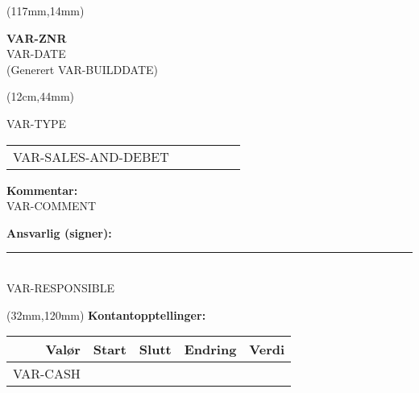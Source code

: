 \documentclass[a4paper, 12pt]{article}
\begin{document}
\begin{textblock*}{47mm}(117mm,14mm)
    \begin{center}
        \Large
        \textbf{VAR-ZNR}
        \normalsize
        \\[1mm]
        VAR-DATE
        \\[1mm]
        \scriptsize{(Generert VAR-BUILDDATE)}
    \end{center}
\end{textblock*}


\begin{textblock*}{8cm}(12cm,44mm)

    VAR-TYPE



    \vspace{5mm}


    \hskip-1.6cm\begin{tabularx}{\textwidth + 1.6cm}{rrcrrX}
        VAR-SALES-AND-DEBET
    \end{tabularx}
    \vspace{5mm}


    \textbf{Kommentar:} \\
VAR-COMMENT


    \vspace{8mm}
    \textbf{Ansvarlig (signer):} \\[8mm]
    \rule{5cm}{0.5pt} \\
    VAR-RESPONSIBLE

\end{textblock*}

\begin{textblock*}{71mm}(32mm,120mm)
    \textbf{Kontantopptellinger:} \\[3mm]
    \begin{tabular}{rrrrr}
        Valør & Start & Slutt & Endring & Verdi \\
        \hline
        VAR-CASH
    \end{tabular}
\end{textblock*}
\end{document}
